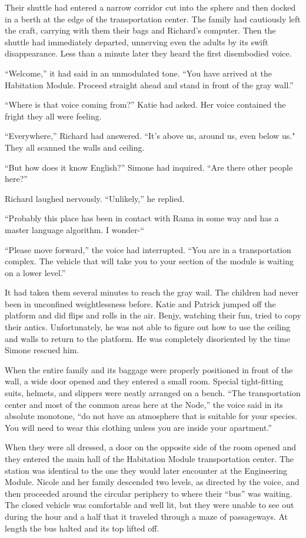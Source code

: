 \documentclass[]{article}
\begin{document}
{Their shuttle had entered a narrow corridor cut into the sphere and then docked in a berth at the edge of the transportation center.  The family had cautiously left the craft, carrying with them their bags and Richard’s computer.  Then the shuttle had immediately departed, unnerving even the adults by its swift disappearance.  Less than a minute later they heard the first disembodied voice.

“Welcome,” it had said in an unmodulated tone.  “You have arrived at the Habitation Module.  Proceed straight ahead and stand in front of the gray wall.”

“Where is that voice coming from?” Katie had asked.  Her voice contained the fright they all were feeling.

“Everywhere,” Richard had answered.  “It’s above us, around us, even below us."  They all scanned the walls and ceiling.

“But how does it know English?” Simone had inquired.  “Are there other people here?”

Richard laughed nervously.  “Unlikely,” he replied.

“Probably this place has been in contact with Rama in some way and has a master language algorithm.  I wonder-“

“Please move forward,” the voice had interrupted.  “You are in a transportation complex.  The vehicle that will take you to your section of the module is waiting on a lower level.”

It had taken them several minutes to reach the gray wail.  The children had never been in unconfined weightlessness before.  Katie and Patrick jumped off the platform and did flips and rolls in the air.  Benjy, watching their fun, tried to copy their antics.  Unfortunately, he was not able to figure out how to use the ceiling and walls to return to the platform.  He was completely disoriented by the time Simone rescued him.

When the entire family and its baggage were properly positioned in front of the wall, a wide door opened and they entered a small room.  Special tight-fitting suits, helmets, and slippers were neatly arranged on a bench.  “The transportation center and most of the common areas here at the Node,” the voice said in its absolute monotone, “do not have an atmosphere that is suitable for your species.  You will need to wear this clothing unless you are inside your apartment.”

When they were all dressed, a door on the opposite side of the room opened and they entered the main hall of the Habitation Module transportation center.  The station was identical to the one they would later encounter at the Engineering Module.  Nicole and her family descended two levels, as directed by the voice, and then proceeded around the circular periphery to where their “bus” was waiting.  The closed vehicle was comfortable and well lit, but they were unable to see out during the hour and a half that it traveled through a maze of passageways.  At length the bus halted and its top lifted off.

}
\end{document}
